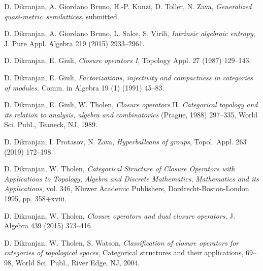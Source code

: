 \documentclass[12pt]{article}
\theoremstyle{definition}
\numberwithin{equation}{section}
\def\gen{generalized\ }
\def\qm{quasi-metric\ }
\begin{document}
\begin{thebibliography}{999}
{ {D. Dikranjan, A. Giordano Bruno, H.-P. Kunzi, D. Toller, N. Zava}, {\em Generalized \qm semilattices}, submitted. 


 {D. Dikranjan, A. Giordano Bruno, L. Salce, S. Virili}, \textit{Intrinsic algebraic entropy}, J. Pure Appl. Algebra 219 (2015) 2933--2961.

  {D. Dikranjan,  E. Giuli}, {\it Closure  operators  I},  Topology Appl. 27  (1987) 129--143.

  {D. Dikranjan,  E. Giuli}, {\it Factorizations, injectivity and compactness in categories of modules.}  Comm. in Algebra {19} (1) (1991) 45--83.

  {D. Dikranjan,  E. Giuli, W. Tholen}, {\em Closure operators} II. {\sl Categorical topology and its relation to analysis, algebra and combinatorics} (Prague, 1988) 297--335, World Sci. Publ., Teaneck, NJ, 1989. 




 {D. Dikranjan, I. Protasov, N. Zava}, {\em Hyperballeans of groups}, Topol. Appl. 263 (2019) 172--198.

 {D. Dikranjan, W. Tholen},  {\it Categorical Structure of Closure Operators with Applications to Topology, Algebra and   Discrete Mathematics},  
{\sl Mathematics and its Applications}, vol. 346, Kluwer Academic Publishers,  Dordrecht-Boston-London 1995, pp. 358+xviii.

 {D. Dikranjan, W. Tholen},  {\it  Closure operators and dual closure operators},  J. Algebra 439 (2015) 373--416

  D. Dikranjan, W. Tholen, S. Watson, {\em Classification of closure operators for categories of topological spaces},
Categorical structures and their applications, 69--98, World Sci. Publ., River Edge, NJ, 2004.

}
\end{thebibliography}
\end{document}
